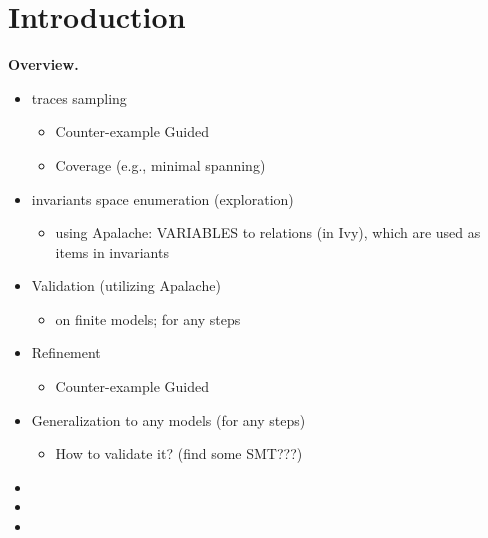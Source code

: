 
\section{Introduction} \label{section:intro}



\bf{Overview.}
\begin{itemize}
 \item \tlaplus traces sampling
   \begin{itemize}
     \item Counter-example Guided
     \item Coverage (e.g., minimal spanning)
   \end{itemize}
 \item invariants space enumeration (exploration)
   \begin{itemize}
     \item using Apalache: VARIABLES to relations (in Ivy),
       which are used as items in invariants
   \end{itemize}
 \item Validation (utilizing Apalache)
   \begin{itemize}
     \item on finite models; for any steps
   \end{itemize}
 \item Refinement
   \begin{itemize}
     \item Counter-example Guided
   \end{itemize}
 \item Generalization to any models (for any steps)
   \begin{itemize}
     \item How to validate it? (find some SMT???)
   \end{itemize}
\end{itemize}

\begin{itemize}
  \item 
  \item 
  \item 
\end{itemize}
